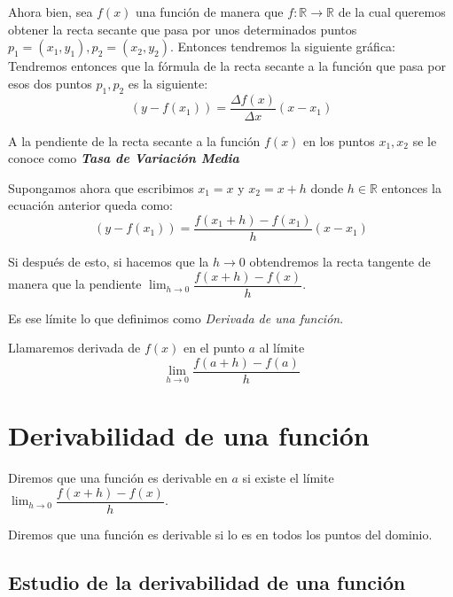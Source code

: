 \noindent
Ahora bien, sea $f(x)$ una función de manera que $f:\mathbb{R}\longrightarrow \mathbb{R}$ de la cual queremos obtener la recta secante que pasa por unos determinados puntos $p_1=(x_1,y_1),p_2=(x_2,y_2)$. Entonces tendremos la siguiente gráfica:\\
\noindent
Tendremos entonces que la fórmula de la recta secante a la función que pasa por esos dos puntos $p_1,p_2$ es la siguiente:
\begin{equation*}
(y-f(x_1))=\dfrac{\Delta f(x)}{\Delta x}(x-x_1)
\end{equation*}
\begin{defi}
A la pendiente de la recta secante a la función $f(x)$ en los puntos $x_1,x_2$ se le conoce como \textbf{\emph{Tasa de Variación Media}}
\end{defi}

\noindent
Supongamos ahora que escribimos $x_1=x$ y $x_2=x+h$ donde $h\in \mathbb{R}$ entonces la ecuación anterior queda como:
\begin{equation*}
(y-f(x_1))=\dfrac{f(x_1+h)-f(x_1)}{h}(x-x_1)
\end{equation*}

\noindent
Si después de esto, si hacemos que la $h\to 0$ obtendremos la recta tangente de manera que la pendiente  $\displaystyle \lim_{h\rightarrow 0}\dfrac{f(x+h)-f(x)}{h}$.

\noindent
Es ese límite lo que definimos como \emph{Derivada de una función}.
\begin{defi}
Llamaremos derivada de $f(x)$ en el punto $a$ al límite
\begin{equation*}
\lim_{h\to 0}\dfrac{f(a+h)-f(a)}{h}
\end{equation*}

\end{defi}
\newpage
\section{Derivabilidad de una función}
\begin{defi}
Diremos que una función es derivable en $a$ si existe el límite $\displaystyle \lim_{h\rightarrow 0}\dfrac{f(x+h)-f(x)}{h}$.
\end{defi}
\begin{defi}
Diremos que una función es derivable si lo es en todos los puntos del dominio.
\end{defi}
\subsection{Estudio de la derivabilidad de una función}

